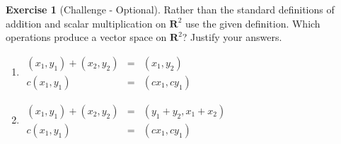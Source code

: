\documentclass{beamer}
\newcommand{\R}{\mathbf{R}}
\newcommand{\fn}{\insertframenumber}
\theoremstyle{definition}
\newtheorem{exercise}{Exercise}
\newenvironment{statementblock}[1]{%
	\setbeamercolor{block body}{bg=Gold!20}
	\setbeamercolor{block title}{bg=Gold}
	\begin{block}{\textbf{#1.}}}{\end{block}}
\begin{document}
\begin{frame}{\fn}
	\begin{exercise}[Challenge - Optional]
		Rather than the standard definitions of addition and scalar multiplication on $\R^2$ use the given definition.  Which operations produce a vector space on $\R^2$?  Justify your answers.
		\begin{enumerate}[label=(\alph*)]\setlength{\itemsep}{.15in}
			\item $\begin{array}{rcl}(x_1,y_1)+(x_2,y_2)&=&(x_1,y_2)\\c(x_1,y_1)&=&(cx_1,cy_1)\end{array}$
			\item $\begin{array}{rcl}(x_1,y_1)+(x_2,y_2)&=&(y_1+y_2,x_1+x_2)\\c(x_1,y_1)&=&(cx_1,cy_1)\end{array}$
		\end{enumerate}
	\end{exercise}
\end{frame}
\end{document}
